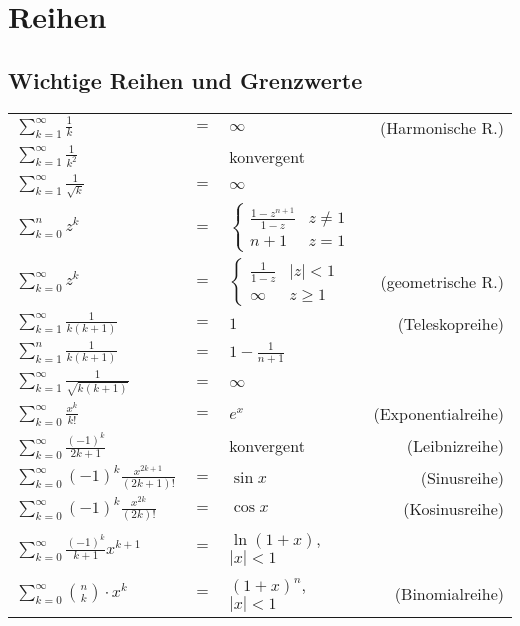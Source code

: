 \documentclass[a4paper,9pt]{extarticle}
\newcommand{\suminfty}[1][k = 1]{\sum_{#1}^{\infty}}
\begin{document}
\section*{Reihen}


	\subsection*{Wichtige Reihen und Grenzwerte}
	
	\begin{tabular}{lcp{2.5cm}r}
		$ \suminfty{\frac{1}{k}} $ & $=$ & $\infty$ & (Harmonische R.)\\ [1ex] %
		$ \suminfty{\frac{1}{k^2}} $ & & konvergent &\\ [1ex]
		$ \suminfty{\frac{1}{\sqrt{k}}} $ & $=$ & $\infty$ &\\ [1ex]
		$ \sum_{k = 0}^n{z^k} $ & $=$ & $
			\begin{cases}
				\frac{1 - z^{n + 1}}{1 - z} & z \neq 1 \\
				n + 1 & z = 1
			\end{cases}
		$ & \\ [1ex] %
		$ \suminfty[k = 0]{z^k} $ & $=$ & $
			\begin{cases}
				\frac{1}{1 - z} & |z| < 1 \\
				∞ & z ≥ 1
			\end{cases}
		$ & (geometrische R.)\\ [1ex] %
		$ \suminfty{\frac{1}{k (k + 1)}} $ & $=$ & $1$ & (Teleskopreihe)\\ [1ex] %
		$ \sum_{k = 1}^{n}{\frac{1}{k (k + 1)}} $ & $=$ & $1 - \frac{1}{n + 1}$ &\\ [1ex] %
		$ \suminfty{\frac{1}{\sqrt{k (k + 1)}}} $ & $=$ & $\infty$ &\\ [1ex]
		$ \suminfty[k = 0]{\frac{x^k}{k!}} $ & $=$ & $e^x$ & (Exponentialreihe)\\ [1ex] %
		$ \suminfty[k = 0]{\frac{(-1)^k}{2k + 1}} $ & & konvergent & (Leibnizreihe)\\ [1ex] %
		$ \suminfty[k = 0] (-1)^k \frac{x^{2k + 1}}{(2k+1)!}$ & $=$ & $\sin x$ & (Sinusreihe) \\
		$ \suminfty[k = 0] (-1)^k \frac{x^{2k}}{(2k)!}$ & $=$ & $\cos x$ & (Kosinusreihe) \\
		$ \suminfty[k = 0] {} \frac{(-1)^k}{k+1} x^{k+1}$ & $=$ & $\ln (1+x)$, $|x| < 1$ & \\
		$ \suminfty[k = 0] \binom{n}{k} ⋅ x^k$ & $=$ & $(1 + x)^n$, $|x| < 1$ & (Binomialreihe)
	\end{tabular}
\end{document}
